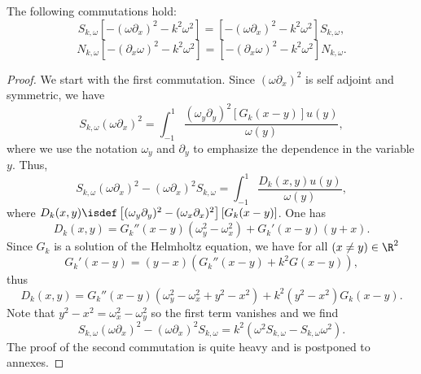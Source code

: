 \documentclass[a4paper]{article}
\begin{document}
\begin{The}
	\label{Commutations}
	The following commutations hold:
	\[S_{k,\omega} \left[-(\omega \partial_x)^2 - k^2\omega^2\right] =  \left[-(\omega \partial_x)^2 - k^2\omega^2\right]S_{k,\omega},\]
	\[N_{k,\omega} \left[-(\partial_x \omega)^2 - k^2\omega^2\right] =  \left[-(\partial_x \omega)^2 - k^2\omega^2\right]N_{k,\omega}.\]
	\begin{proof}
		We start with the first commutation. Since $(\omega \partial_x)^2$ is self adjoint and symmetric, we have 
		\[S_{k,\omega} (\omega \partial_x)^2 = \int_{-1}^{1} \frac{(\omega_y \partial_y)^2 \left[G_k(x-y)\right] u(y)}{\omega(y)},\]
		where we use the notation $\omega_y$ and $\partial_y$ to emphasize the dependence in the variable $y$. 
		Thus, 
		\[S_{k,\omega} (\omega \partial_x)^2 - (\omega \partial_x)^2 S_{k,\omega} = \int_{-1}^{1} \frac{D_k(x,y)u(y)}{\omega(y)},\]
		where $D_k(x,y) \isdef \left[(\omega_y \partial_y)^2 - (\omega_x \partial_x)^2\right] \left[G_k(x-y)\right]$. 
		One has 
		\[D_k(x,y) = G_k''(x-y) (\omega^2_y - \omega^2_x) + G_k'(x-y)(y + x).\]
		Since $G_k$ is a solution of the Helmholtz equation, we have for all $(x \neq y) \in \R^2$ 
		\[G_k'(x-y) = (y-x)(G_k''(x-y) + k^2G(x-y)),\]
		thus
		\[D_k(x,y) = G_k''(x-y)\left(\omega^2_y - \omega_x^2 + y^2 - x^2\right) + k^2(y^2 - x^2)G_k(x-y) . \]
		Note that $y^2 - x^2 = \omega_x^2 - \omega_y^2$ so the first term vanishes and we find
		\[S_{k,\omega} (\omega \partial_x)^2 - (\omega \partial_x)^2 S_{k,\omega} =  k^2\left(\omega^2 S_{k,\omega} -S_{k,\omega} \omega^2 \right). \]
		The proof of the second commutation is quite heavy and is postponed to annexes. 
	\end{proof}
\end{The}
\end{document}
